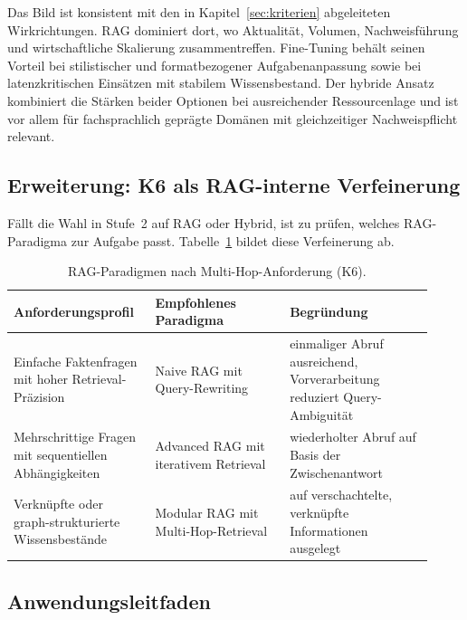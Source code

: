 Das Bild ist konsistent mit den in Kapitel~\ref{sec:kriterien} abgeleiteten Wirkrichtungen. RAG dominiert dort, wo Aktualität, Volumen, Nachweisführung und wirtschaftliche Skalierung zusammentreffen. Fine-Tuning behält seinen Vorteil bei stilistischer und formatbezogener Aufgabenanpassung sowie bei latenzkritischen Einsätzen mit stabilem Wissensbestand. Der hybride Ansatz kombiniert die Stärken beider Optionen bei ausreichender Ressourcenlage und ist vor allem für fachsprachlich geprägte Domänen mit gleichzeitiger Nachweispflicht relevant.

\subsection{Erweiterung: K6 als RAG-interne Verfeinerung}
\label{sec:matrix-k6}

Fällt die Wahl in Stufe~2 auf RAG oder Hybrid, ist zu prüfen, welches RAG-Paradigma zur Aufgabe passt. Tabelle~\ref{tab:rag-paradigmen} bildet diese Verfeinerung ab.

\begin{table}[ht]
  \centering
  \small
  \renewcommand{\arraystretch}{1.15}
  \caption{RAG-Paradigmen nach Multi-Hop-Anforderung (K6).}
  \label{tab:rag-paradigmen}
  \begin{tabular}{@{} >{\RaggedRight\arraybackslash}p{0.30\linewidth} 
                      >{\RaggedRight\arraybackslash}p{0.30\linewidth} 
                      >{\RaggedRight\arraybackslash}p{0.32\linewidth} @{}}
    \toprule
    \textbf{Anforderungsprofil} & \textbf{Empfohlenes Paradigma} & \textbf{Begründung} \\
    \midrule
    Einfache Faktenfragen mit hoher Retrieval-Präzision & Naive RAG mit Query-Rewriting & einmaliger Abruf ausreichend, Vorverarbeitung reduziert Query-Ambiguität \autocite[4]{Gao.2024} \\
    \addlinespace
    Mehrschrittige Fragen mit sequentiellen Abhängigkeiten & Advanced RAG mit iterativem Retrieval & wiederholter Abruf auf Basis der Zwischenantwort \autocite[11]{Gao.2024} \\ 
    \addlinespace
    Verknüpfte oder graph-strukturierte Wissensbestände & Modular RAG mit Multi-Hop-Retrieval & auf verschachtelte, verknüpfte Informationen ausgelegt \autocite[11]{Gao.2024} \\
    \bottomrule
  \end{tabular}
\end{table}


\newpage
\subsection{Anwendungsleitfaden}
\label{sec:leitfaden}


